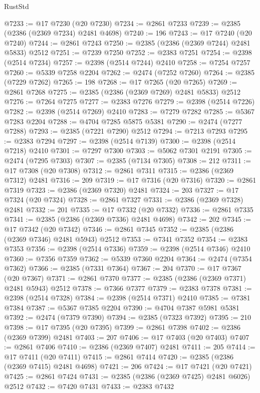 \begin{lexlean}{RustStd}
\begin{coremodule}
@7233 := @17 @7230 (@20 @7230)
@7234 := @2861 @7233
@7239 := @2385 (@2386 (@2369 @7234) @2481 @4698)
@7240 := 196
@7243 := @17 @7240 (@20 @7240)
@7244 := @2861 @7243
@7250 := @2385 (@2386 (@2369 @7244) @2481 @5833) @2512
@7251 := @7239 @7250
@7252 := @2383 @7251
@7254 := @2398 (@2514 @7234)
@7257 := @2398 (@2514 @7244) @2410
@7258 := @7254 @7257
@7260 := @5339 @7258 @2204
@7262 := @2474 (@7252 @7260)
@7264 := @2385 (@7229 @7262)
@7265 := 198
@7268 := @17 @7265 (@20 @7265)
@7269 := @2861 @7268
@7275 := @2385 (@2386 (@2369 @7269) @2481 @5833) @2512
@7276 := @7264 @7275
@7277 := @2383 @7276
@7279 := @2398 (@2514 @7226)
@7282 := @2398 (@2514 @7269) @2410
@7283 := @7279 @7282
@7285 := @5367 @7283 @2204
@7288 := @4704 @7285 @5875 @5381
@7290 := @2474 (@7277 @7288)
@7293 := @2385 (@7221 @7290) @2512
@7294 := @7213 @7293
@7295 := @2383 @7294
@7297 := @2398 (@2514 @7139)
@7300 := @2398 (@2514 @7218) @2410
@7301 := @7297 @7300
@7303 := @5062 @7301 @2191
@7305 := @2474 (@7295 @7303)
@7307 := @2385 (@7134 @7305)
@7308 := 212
@7311 := @17 @7308 (@20 @7308)
@7312 := @2861 @7311
@7315 := @2386 (@2369 @7312) @2481
@7316 := 209
@7319 := @17 @7316 (@20 @7316)
@7320 := @2861 @7319
@7323 := @2386 (@2369 @7320) @2481
@7324 := 203
@7327 := @17 @7324 (@20 @7324)
@7328 := @2861 @7327
@7331 := @2386 (@2369 @7328) @2481
@7332 := 201
@7335 := @17 @7332 (@20 @7332)
@7336 := @2861 @7335
@7341 := @2385 (@2386 (@2369 @7336) @2481 @4698)
@7342 := 202
@7345 := @17 @7342 (@20 @7342)
@7346 := @2861 @7345
@7352 := @2385 (@2386 (@2369 @7346) @2481 @5943) @2512
@7353 := @7341 @7352
@7354 := @2383 @7353
@7356 := @2398 (@2514 @7336)
@7359 := @2398 (@2514 @7346) @2410
@7360 := @7356 @7359
@7362 := @5339 @7360 @2204
@7364 := @2474 (@7354 @7362)
@7366 := @2385 (@7331 @7364)
@7367 := 204
@7370 := @17 @7367 (@20 @7367)
@7371 := @2861 @7370
@7377 := @2385 (@2386 (@2369 @7371) @2481 @5943) @2512
@7378 := @7366 @7377
@7379 := @2383 @7378
@7381 := @2398 (@2514 @7328)
@7384 := @2398 (@2514 @7371) @2410
@7385 := @7381 @7384
@7387 := @5367 @7385 @2204
@7390 := @4704 @7387 @5981 @5381
@7392 := @2474 (@7379 @7390)
@7394 := @2385 (@7323 @7392)
@7395 := 210
@7398 := @17 @7395 (@20 @7395)
@7399 := @2861 @7398
@7402 := @2386 (@2369 @7399) @2481
@7403 := 207
@7406 := @17 @7403 (@20 @7403)
@7407 := @2861 @7406
@7410 := @2386 (@2369 @7407) @2481
@7411 := 205
@7414 := @17 @7411 (@20 @7411)
@7415 := @2861 @7414
@7420 := @2385 (@2386 (@2369 @7415) @2481 @4698)
@7421 := 206
@7424 := @17 @7421 (@20 @7421)
@7425 := @2861 @7424
@7431 := @2385 (@2386 (@2369 @7425) @2481 @6026) @2512
@7432 := @7420 @7431
@7433 := @2383 @7432

\end{coremodule}
\end{lexlean}
